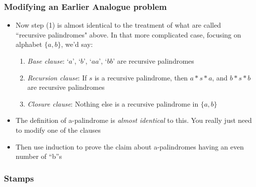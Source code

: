 \begin{frame}
\frametitle{Modifying an Earlier Analogue problem}

\begin{itemize}[<+->]
\item Now step (1) is almost identical to the treatment of what are called ``recursive palindromes" above. In that more complicated case, focusing on alphabet $\{a,b\}$, we'd say: 



\begin{enumerate}
\item {\emph{Base clause}}: `$a$', `$b$', `$aa$', `$bb$' are recursive palindromes

\item {\emph{Recursion clause}}: If $s$ is a recursive palindrome, then $a*s*a$, \phantom{vvvvvvvvvvvvvv} and $b*s*b$ are recursive palindromes

\item {\emph{Closure clause}}: Nothing else is a recursive palindrome in $\{a,b\}$
\end{enumerate}


\item The definition of a-palindrome is {\it{almost identical}} to this. You really just need to modify one of the clauses

\item Then use induction to prove the claim about a-palindromes having an even number of ``b''s 



\end{itemize} 
\end{frame}

\subsubsection{Stamps}

